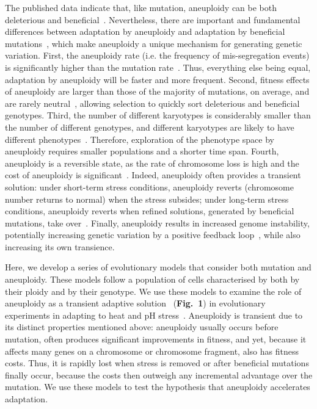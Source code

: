 \documentclass[12pt]{extarticle}
\begin{document}
The published data indicate that, like mutation, aneuploidy can be both deleterious and beneficial~\citep{Pavelka2010, Sheltzer2011}.
Nevertheless, there are important and fundamental differences between adaptation by aneuploidy
and adaptation by beneficial mutations~\citep{Yona2015}, which make aneuploidy a unique mechanism for generating genetic
variation.
First, the aneuploidy rate (i.e. the frequency of mis-segregation events) is significantly higher than the
mutation rate~\citep{Santaguida2015}.
Thus, everything else being equal, adaptation by aneuploidy will be faster and more frequent.
Second, fitness effects of aneuploidy are larger than those of the majority of mutations, on average, and are rarely
neutral~\citep{Pavelka2010, Yona2012, Sunshine2015}, allowing selection to quickly sort deleterious and beneficial genotypes.
Third, the number of different karyotypes is considerably smaller than the number of different genotypes, and different karyotypes are likely to have different phenotypes~\citep{Pavelka2010}.
Therefore, exploration of the phenotype space by aneuploidy requires smaller populations and a shorter time span.
Fourth, aneuploidy is a reversible state, as the rate of chromosome loss is high and the cost of aneuploidy is significant~\citep{Niwa2006}.
Indeed, aneuploidy often provides a transient solution: under short-term stress conditions, aneuploidy reverts (chromosome number returns to normal) when the stress subsides; under long-term stress conditions, aneuploidy reverts when refined solutions, generated by beneficial mutations, take over~\citep{Yona2012}.
Finally, aneuploidy results in increased genome instability, potentially increasing genetic variation by a positive feedback loop~\citep{Rancati2013, Bouchonville2009, Zhu2012}, while also increasing its own transience.

Here, we develop a series of evolutionary models that consider both mutation and aneuploidy.
These models follow a population of cells characterised by both by their ploidy and by their genotype.
We use these models to examine the role of aneuploidy as a transient adaptive solution~\citep{Yona2015} (\textbf{Fig.~1}) in evolutionary experiments in \yeast adapting to heat and pH stress~\citep{Yona2012}.
Aneuploidy is transient due to its distinct properties mentioned above: aneuploidy usually occurs before mutation, often produces significant improvements in fitness, and yet, because it affects many genes on a chromosome or chromosome fragment, also has fitness costs.
Thus, it is rapidly lost when stress is removed or after beneficial mutations finally occur, because the costs then outweigh any incremental advantage over the mutation.
We use these models to test the hypothesis that aneuploidy accelerates adaptation.
\end{document}
